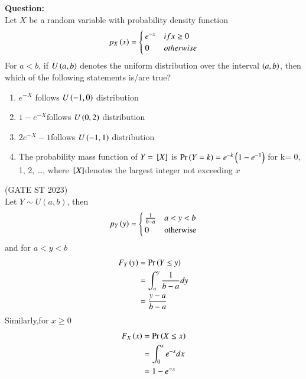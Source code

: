 \documentclass[book,11pt]{IEEEtran}
\begin{document}
\textbf{Question:}\\
Let $X$ be a random variable with probability density function
\begin{align}
p_{X}\left(x\right)=\begin{cases}
		e^{-x} & if x\ge 0\\ 
		0 & otherwise
	\end{cases}
\end{align}
For $a<b$, if $U\left(a,b\right)$ denotes the uniform distribution over the interval $\left(a,b\right)$,
then which of the following statements is/are true?
\begin{enumerate}[label=(\Alph*)]
\item $e^{-X}$ follows $U\left(-1,0\right)$ distribution
\item $1-e^{-X}$follows $U\left(0,2\right)$ distribution
\item $2e^{-X}-1$follows $U\left(-1,1\right)$ distribution
\item The probability mass function of $Y={}\left[X\right]$ is
$\Pr\left(Y=k\right)=e^{-k}\left(1-e^{-1}\right)$ for k= 0, 1, 2, …,
where ${}\left[X\right]$denotes the largest integer not exceeding $x$
\end{enumerate}
\hfill(GATE ST 2023)\\
\solution
Let $Y\sim U(a,b)$, then
\begin{align}
p_Y\left(y\right)=\begin{cases}
		\frac{1}{b-a} & a<y<b\\ 
		0 & \text{otherwise}
	\end{cases}
\end{align}
and for $a<y<b$ 
\begin{align}
F_Y\left(y\right)&=\Pr\left(Y \le y\right)\\
&=\int_{a}^{y}\frac{1}{b-a}dy\\
&=\frac{y-a}{b-a}
\end{align}
Similarly,for $x\ge 0$
\begin{align}
F_X\left(x\right)&=\Pr\left(X \le x\right)\\
&=\int_{0}^{x}e^{-x}dx\\
&=1-e^{-x}
\end{align}
\end{document}
